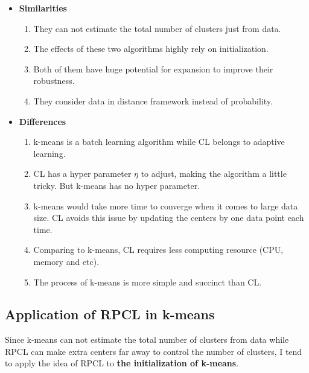 \documentclass[12pt,a4paper]{article}
\theoremstyle{definition}
\begin{document}
\begin{itemize}
	\item \textbf{Similarities}
	
	\begin{enumerate}
		\item They can not estimate the total number of clusters just from data.
		
		\item The effects of these two algorithms highly rely on initialization.
		
		\item Both of them have huge potential for expansion to improve their robustness.
		
		\item They consider data in distance framework instead of probability.
	\end{enumerate}
	
	\item \textbf{Differences}
	
	\begin{enumerate}
		\item k-means is a batch learning algorithm while CL belongs to adaptive learning.
		
		\item CL has a hyper parameter $\eta$ to adjust, making the algorithm a little tricky. But k-means has no hyper parameter.
		
		\item k-means would take more time to converge when it comes to large data size. CL avoids this issue by updating the centers by one data point each time.
		
		\item Comparing to k-means, CL requires less computing resource (CPU, memory and etc).

		\item The process of k-means is more simple and succinct than CL.
	\end{enumerate}
\end{itemize}

\subsection{Application of RPCL in k-means}
\label{sec:RPCL}

Since k-means can not estimate the total number of clusters from data while RPCL can make extra centers far away to control the number of clusters, I tend to apply the idea of RPCL to \textbf{the initialization of k-means}.
\end{document}
